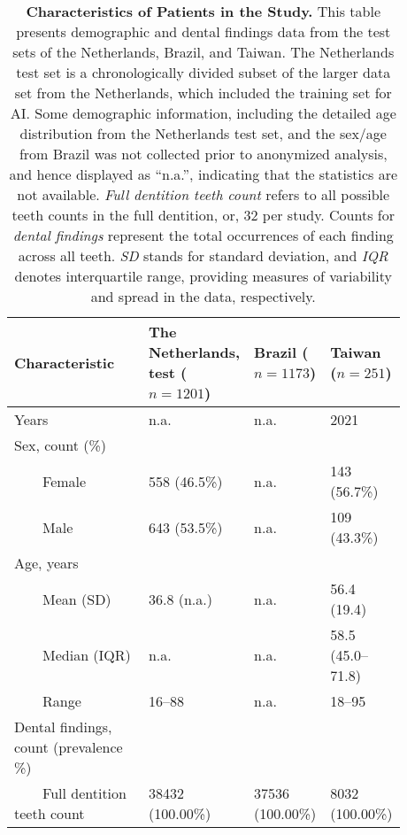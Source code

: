 \begin{table}[t]
\centering \caption{   \textbf{Characteristics of Patients in the Study.}   This table presents demographic and dental findings data from the test sets of the Netherlands, Brazil, and Taiwan.   The Netherlands test set is a chronologically divided subset of the larger data set from the Netherlands, which included the training set for AI.   Some demographic information, including the detailed age distribution from the Netherlands test set, and the sex/age from Brazil was not collected prior to anonymized analysis, and hence displayed as ``n.a.'', indicating that the statistics are not available.   \emph{Full dentition teeth count} refers to all possible teeth counts in the full dentition, or, 32 per study.   Counts for \emph{dental findings} represent the total occurrences of each finding across all teeth.   \emph{SD} stands for standard deviation, and \emph{IQR} denotes interquartile range, providing measures of variability and spread in the data, respectively. } \label{tbl:data-statistics} \small {}
\begin{tabular}{ p{0.35\linewidth}p{0.175\linewidth}p{0.175\linewidth}p{0.175\linewidth} }
\toprule
Characteristic & The Netherlands, test \newline ($n=\num{1201}$) & Brazil \newline ($n=\num{1173}$) & Taiwan \newline ($n=\num{251}$) \\ \midrule
Years & n.a. & n.a. & 2021 \\ \midrule
Sex, count (\%) &   &   &   \\
{~~~~}Female & 558 (46.5\%) & n.a. & 143 (56.7\%)  \\
{~~~~}Male & 643 (53.5\%) & n.a. & 109 (43.3\%) \\ \midrule
Age, years &   &   &   \\
{~~~~}Mean (SD) & 36.8 (n.a.) & n.a. & 56.4 (19.4) \\
{~~~~}Median (IQR) & n.a. & n.a. & 58.5 (45.0--71.8) \\
{~~~~}Range & 16--88 & n.a. & 18--95 \\ \midrule
Dental findings, count (prevalence \%) &   &   &   \\
{~~~~}Full dentition teeth count & \num{38432} (100.00\%) & \num{37536} (100.00\%) & \num{8032} (100.00\%) \\

\end{tabular}
\end{table}
